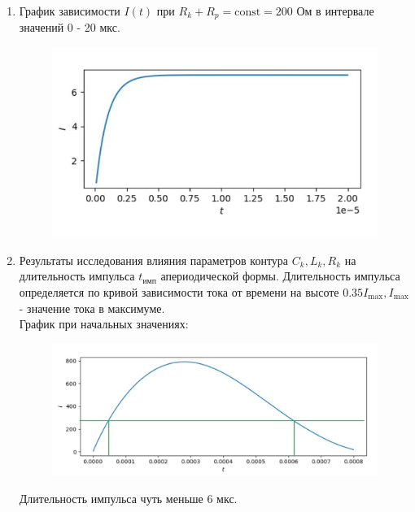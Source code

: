\documentclass[14pt, a4paper]{extarticle}
\begin{document}
\begin{enumerate}
		\item График зависимости $I(t)$ при $R_k + R_p = \text{const} = 200$ Ом в интервале значений 0 - 20 мкс.
		\begin{figure}[h]
			\centering
			\includegraphics[scale=1]{graphics/graphs3.jpg}
		\end{figure}\par
		
		\item Результаты исследования влияния параметров контура $C_k, L_k, R_k$ на длительность импульса $t_{\text{имп}}$ апериодической формы. Длительность импульса определяется по кривой зависимости тока от времени на высоте $0.35I_{\text{max}}, I_{\text{max}}$ - значение тока в максимуме.\\
		\newpage
		График при начальных значениях:
		\begin{figure}[h!]
			\centering
			\includegraphics[scale=0.8]{graphics/graphs41.jpg}
		\end{figure}\par
		Длительность импульса чуть меньше 6 мкс.
		

\end{enumerate}
\end{document}
